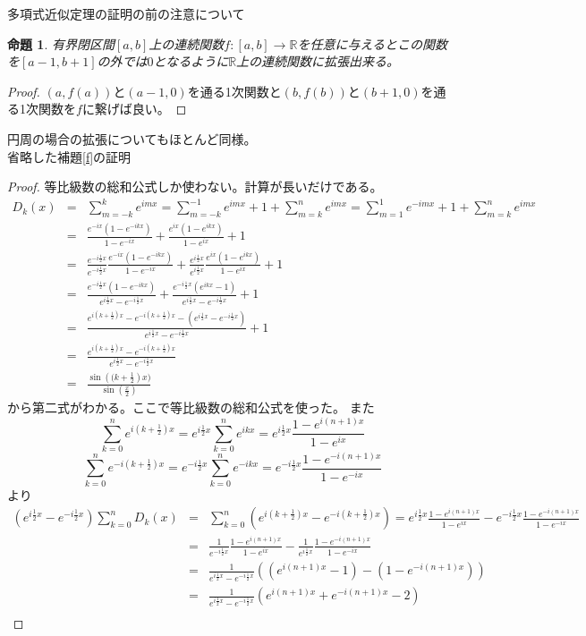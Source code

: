 \documentclass[leqno]{jsarticle}
\newtheorem{proposition}[theorem]{命題}
\newcommand{\rr}{\mathbb{R}}
\newcommand{\bms}{e^{i(k+\frac{1}{2})x}-e^{-i(k+\frac{1}{2})x}}
\newcommand{\bmb}{e^{i\frac{1}{2}x}-e^{-i\frac{1}{2}x}}
\newcommand{\hf}{\frac{1}{2}}
\begin{document}
多項式近似定理の証明の前の注意について
\begin{proposition}有界閉区間$[a,b]$上の連続関数$f:[a,b]\to \rr$を任意に与えるとこの関数を$[a-1,b+1]$の外では$0$となるように$\rr$上の連続関数に拡張出来る。
\end{proposition}
\begin{proof}
$(a,f(a))$と$(a-1,0)$を通る1次関数と$(b,f(b))$と$(b+1,0)$を通る1次関数を$f$に繋げば良い。
\end{proof}
円周の場合の拡張についてもほとんど同様。\\ 
省略した補題\ref{f}の証明
\begin{proof}
等比級数の総和公式しか使わない。計算が長いだけである。
\begin{eqnarray*}
D_k(x)&=&\sum_{m=-k}^{k}e^{imx}=\sum_{m=-k}^{-1}e^{imx}+1+\sum_{m=k}^ne^{imx}=
\sum_{m=1}^{1}e^{-imx}+1+\sum_{m=k}^ne^{imx}\\ 
&=&\frac{e^{-ix}(1-e^{-ikx})}{1-e^{-ix}}+\frac{e^{ix}(1-e^{ikx})}{1-e^{ix}}+1\\ 
&=&
\frac{e^{-i\frac{1}{2}x}}{e^{-i\frac{1}{2}x}} \frac{e^{-ix}(1-e^{-ikx})}{1-e^{-ix}}+
\frac{e^{i\frac{1}{2}x}}{e^{i\frac{1}{2}x}} \frac{e^{ix}(1-e^{ikx})}{1-e^{ix}} +1\\ 
&=&\frac{e^{-i\hf x}(1-e^{-ikx})}{e^{i\hf x}-e^{-i\hf x}}+\frac{e^{-i\hf x}(e^{ikx}-1)}{e^{i\hf x}-e^{-i\hf x}}+1\\ 
&=&\frac{\bms-(e^{i\hf x}-e^{-i\hf x})}{e^{i\hf x}-e^{-i\hf x}}+1\\ 
&=&\frac{\bms}{\bmb}\\ 
&=&\frac{\sin\left((k+\frac{1}{2}\right)x)}{\sin(\frac{x}{2})}
\end{eqnarray*}
から第二式がわかる。ここで等比級数の総和公式を使った。
また
\[
\sum_{k=0}^n e^{i(k+\hf )x}=e^{i \hf x}\sum_{k=0}^n e^{ikx}=e^{i\hf x}\frac{1-e^{i(n+1)x}}{1-e^{ix}}
\]
\[
\sum_{k=0}^n e^{-i(k+\hf )x}=e^{-i \hf x}\sum_{k=0}^n e^{-ikx}=e^{-i\hf x}\frac{1-e^{-i(n+1)x}}{1-e^{-ix}}
\]
より
\begin{eqnarray*}
(\bmb)\sum_{k=0}^n D_k(x)&=&\sum_{k=0}^n\left(e^{i(k+\hf )x}-e^{-i(k+\hf )x}\right) =e^{i\hf x}\frac{1-e^{i(n+1)x}}{1-e^{ix}}-
e^{-i\hf x}\frac{1-e^{-i(n+1)x}}{1-e^{-ix}}\\ 
&=&\frac{1}{e^{-i\hf x}}\frac{1-e^{i(n+1)x}}{1-e^{ix}}-\frac{1}{e^{i\hf x}}\frac{1-e^{-i(n+1)x}}{1-e^{-ix}}\\ 
&=&\frac{1}{\bmb}\left(  (e^{i(n+1)x}-1)-(1-e^{-i(n+1)x})         \right)\\ 
&=&\frac{1}{\bmb}\left(  e^{i(n+1)x}+e^{-i(n+1)x}-2         \right)\\ 

\end{eqnarray*}
\end{proof}
\end{document}

